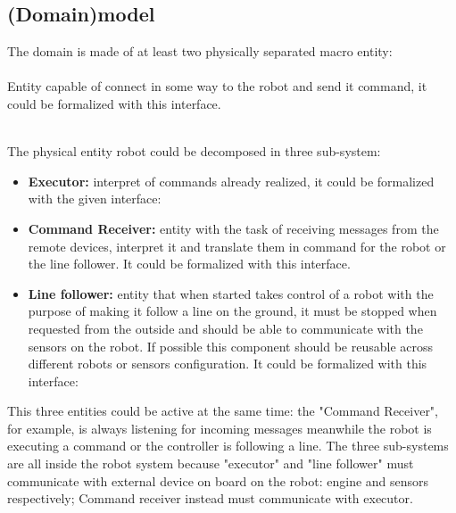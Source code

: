 \documentclass{llncs}
\begin{document}

\subsection{(Domain)model}
The domain is made of at least two physically separated macro entity:\\

\\
Entity capable of connect in some way to the robot and send it command, it could be formalized with this interface.


\\
The physical entity robot could be decomposed in three sub-system:
\begin{itemize}
	\item \textbf{Executor:} interpret of commands already realized, it could be formalized with the given interface:
		
	\item \textbf{Command Receiver:} entity with the task of receiving messages from the remote devices, interpret it and translate them in command for the robot or the line follower. It could be formalized with this interface.
		
	\item \textbf{Line follower:} entity that when started takes control of a robot with the purpose of making it follow a line on the ground, it must be stopped when requested from the outside and should be able to communicate with the sensors on the robot. If possible this component should be reusable across different robots or sensors configuration. It could be formalized with this interface:
		
\end{itemize}
This three entities could be active at the same time: the "Command Receiver", for example, is always listening for incoming messages meanwhile the robot is executing a command or the controller is following a line. The three sub-systems are all inside the robot system because "executor" and "line follower" must communicate with external device on board on the robot: engine and sensors respectively; Command receiver instead must communicate with executor.
\end{document}
